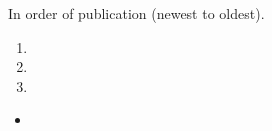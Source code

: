 \newpage
\begin{fullwidth}
  In order of publication (newest to oldest).

  \divider


  \begin{enumerate} \normalsize
  \item  \divider
  \item  \divider
  \item 
  \end{enumerate}

  \divider


  \begin{itemize} \normalsize
  \item  \divider
  \end{itemize}
\end{fullwidth}

\iffalse
\cvsection{Volunteering}
I have been very active at the university outside of the studies. Below are some
things I have volunteered for among other things

\medskip



\divider



\divider


\fi



